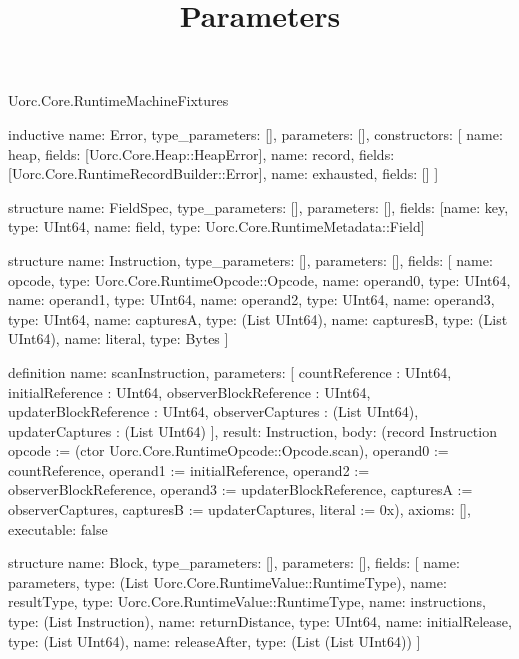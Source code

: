 \begin{lexlean}{Uorc.Core.RuntimeMachineFixtures}
\title{Parameters}
\begin{semanticmodule}
inductive{
  name: Error,
  type_parameters: [],
  parameters: [],
  constructors: [
    {name: heap, fields: [Uorc.Core.Heap::HeapError]},
    {name: record, fields: [Uorc.Core.RuntimeRecordBuilder::Error]},
    {name: exhausted, fields: []}
  ]
}

structure{
  name: FieldSpec,
  type_parameters: [],
  parameters: [],
  fields: [{name: key, type: UInt64}, {name: field, type: Uorc.Core.RuntimeMetadata::Field}]
}

structure{
  name: Instruction,
  type_parameters: [],
  parameters: [],
  fields: [
    {name: opcode, type: Uorc.Core.RuntimeOpcode::Opcode},
    {name: operand0, type: UInt64},
    {name: operand1, type: UInt64},
    {name: operand2, type: UInt64},
    {name: operand3, type: UInt64},
    {name: capturesA, type: (List UInt64)},
    {name: capturesB, type: (List UInt64)},
    {name: literal, type: Bytes}
  ]
}

definition{
  name: scanInstruction,
  parameters: [
    countReference : UInt64,
    initialReference : UInt64,
    observerBlockReference : UInt64,
    updaterBlockReference : UInt64,
    observerCaptures : (List UInt64),
    updaterCaptures : (List UInt64)
  ],
  result: Instruction,
  body: (record Instruction {opcode := (ctor Uorc.Core.RuntimeOpcode::Opcode.scan), operand0 := countReference, operand1 := initialReference, operand2 := observerBlockReference, operand3 := updaterBlockReference, capturesA := observerCaptures, capturesB := updaterCaptures, literal := 0x}),
  axioms: [],
  executable: false
}

structure{
  name: Block,
  type_parameters: [],
  parameters: [],
  fields: [
    {name: parameters, type: (List Uorc.Core.RuntimeValue::RuntimeType)},
    {name: resultType, type: Uorc.Core.RuntimeValue::RuntimeType},
    {name: instructions, type: (List Instruction)},
    {name: returnDistance, type: UInt64},
    {name: initialRelease, type: (List UInt64)},
    {name: releaseAfter, type: (List (List UInt64))}
  ]
}


\end{semanticmodule}
\end{lexlean}

